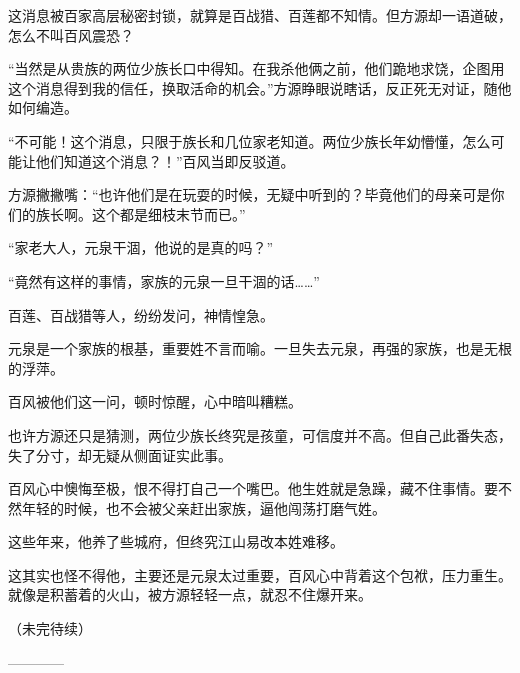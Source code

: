 \begin{this_body}
这消息被百家高层秘密封锁，就算是百战猎、百莲都不知情。但方源却一语道破，怎么不叫百风震恐？

“当然是从贵族的两位少族长口中得知。在我杀他俩之前，他们跪地求饶，企图用这个消息得到我的信任，换取活命的机会。”方源睁眼说瞎话，反正死无对证，随他如何编造。

“不可能！这个消息，只限于族长和几位家老知道。两位少族长年幼懵懂，怎么可能让他们知道这个消息？！”百风当即反驳道。

方源撇撇嘴：“也许他们是在玩耍的时候，无疑中听到的？毕竟他们的母亲可是你们的族长啊。这个都是细枝末节而已。”

“家老大人，元泉干涸，他说的是真的吗？”

“竟然有这样的事情，家族的元泉一旦干涸的话……”

百莲、百战猎等人，纷纷发问，神情惶急。

元泉是一个家族的根基，重要姓不言而喻。一旦失去元泉，再强的家族，也是无根的浮萍。

百风被他们这一问，顿时惊醒，心中暗叫糟糕。

也许方源还只是猜测，两位少族长终究是孩童，可信度并不高。但自己此番失态，失了分寸，却无疑从侧面证实此事。

百风心中懊悔至极，恨不得打自己一个嘴巴。他生姓就是急躁，藏不住事情。要不然年轻的时候，也不会被父亲赶出家族，逼他闯荡打磨气姓。

这些年来，他养了些城府，但终究江山易改本姓难移。

这其实也怪不得他，主要还是元泉太过重要，百风心中背着这个包袱，压力重生。就像是积蓄着的火山，被方源轻轻一点，就忍不住爆开来。

（未完待续）

------------

\end{this_body}

